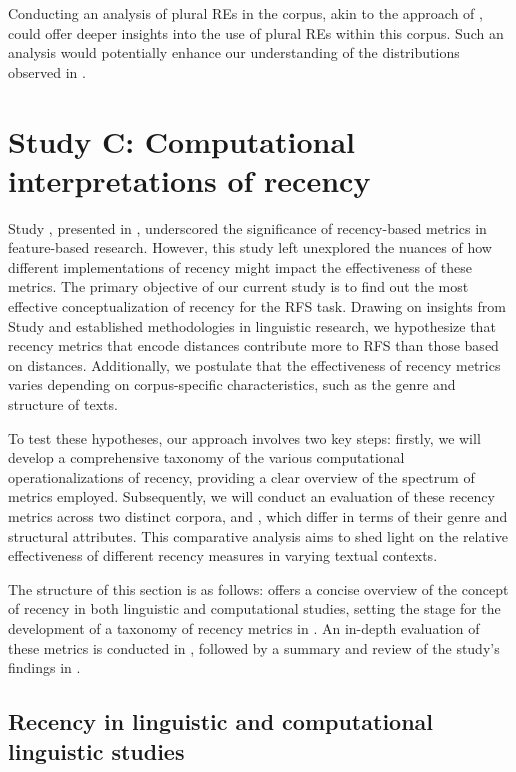 Conducting an analysis of plural REs in the \wsj corpus, akin to the approach of \citet{gatt2009generating}, could offer deeper insights into the use of plural REs within this corpus. Such an analysis would potentially enhance our understanding of the distributions observed in .


\section{Study C: Computational interpretations of recency}\label{sec:recency}

Study \studB, presented in , underscored the significance of recency-based metrics in feature-based \context research. However, this study left unexplored the nuances of how different implementations of recency might impact the effectiveness of these metrics. The primary objective of our current study is to find out the most effective conceptualization of recency for the RFS task. Drawing on insights from Study \studB and established methodologies in linguistic research, we hypothesize that recency metrics that encode  distances contribute more to RFS than those based on  distances. Additionally, we postulate that the effectiveness of recency metrics varies depending on corpus-specific characteristics, such as the genre and structure of texts.

To test these hypotheses, our approach involves two key steps: firstly, we will develop a comprehensive taxonomy of the various computational operationalizations of recency, providing a clear overview of the spectrum of metrics employed. Subsequently, we will conduct an evaluation of these recency metrics across two distinct corpora, \grectwo and \wsj, which differ in terms of their genre and structural attributes. This comparative analysis aims to shed light on the relative effectiveness of different recency measures in varying textual contexts.

The structure of this section is as follows:  offers a concise overview of the concept of recency in both linguistic and computational studies, setting the stage for the development of a taxonomy of recency metrics in . An in-depth evaluation of these metrics is conducted in , followed by a summary and review of the study's findings in .

\subsection{Recency in linguistic and computational linguistic studies}\label{subsec:recencylit}

